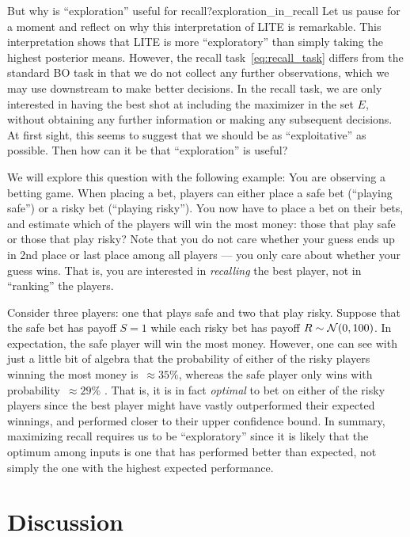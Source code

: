 \begin{rmk}{But why is ``exploration'' useful for recall?}{exploration_in_recall}
  Let us pause for a moment and reflect on why this interpretation of LITE is remarkable.
  This interpretation shows that LITE is more ``exploratory'' than simply taking the highest posterior means.
  However, the recall task~\eqref{eq:recall_task} differs from the standard BO task in that we do not collect any further observations, which we may use downstream to make better decisions.
  In the recall task, we are only interested in having the best shot at including the maximizer in the set $E$, without obtaining any further information or making any subsequent decisions.
  At first sight, this seems to suggest that we should be as ``exploitative'' as possible.
  Then how can it be that ``exploration'' is useful?

  We will explore this question with the following example: You are observing a betting game.
  When placing a bet, players can either place a safe bet (``playing safe'') or a risky bet (``playing risky'').
  You now have to place a bet on their bets, and estimate which of the players will win the most money: those that play safe or those that play risky?
  Note that you do not care whether your guess ends up in 2nd place or last place among all players --- you only care about whether your guess wins.
  That is, you are interested in \emph{recalling} the best player, not in ``ranking'' the players.

  Consider three players: one that plays safe and two that play risky.
  Suppose that the safe bet has payoff $S = 1$ while each risky bet has payoff $R \sim \N{0}{100}$.
  In expectation, the safe player will win the most money.
  However, one can see with just a little bit of algebra that the probability of either of the risky players winning the most money is~$\approx\! 35\%$, whereas the safe player only wins with probability~$\approx\! 29\%$ .
  That is, it is in fact \emph{optimal} to bet on either of the risky players since the best player might have vastly outperformed their expected winnings, and performed closer to their upper confidence bound.
  In summary, maximizing recall requires us to be ``exploratory'' since it is likely that the optimum among inputs is one that has performed better than expected, not simply the one with the highest expected performance.
\end{rmk}

\section*{Discussion}

